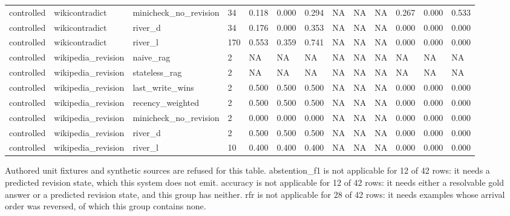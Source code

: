 \begin{table}
\begin{tabular}{lllllllllllll}
controlled & wikicontradict & minicheck\_no\_revision & 34 & 0.118 & 0.000 & 0.294 & NA & NA & NA & 0.267 & 0.000 & 0.533 \\
controlled & wikicontradict & river\_d & 34 & 0.176 & 0.000 & 0.353 & NA & NA & NA & 0.000 & 0.000 & 0.000 \\
controlled & wikicontradict & river\_l & 170 & 0.553 & 0.359 & 0.741 & NA & NA & NA & 0.000 & 0.000 & 0.000 \\
controlled & wikipedia\_revision & naive\_rag & 2 & NA & NA & NA & NA & NA & NA & NA & NA & NA \\
controlled & wikipedia\_revision & stateless\_rag & 2 & NA & NA & NA & NA & NA & NA & NA & NA & NA \\
controlled & wikipedia\_revision & last\_write\_wins & 2 & 0.500 & 0.500 & 0.500 & NA & NA & NA & 0.000 & 0.000 & 0.000 \\
controlled & wikipedia\_revision & recency\_weighted & 2 & 0.500 & 0.500 & 0.500 & NA & NA & NA & 0.000 & 0.000 & 0.000 \\
controlled & wikipedia\_revision & minicheck\_no\_revision & 2 & 0.000 & 0.000 & 0.000 & NA & NA & NA & 0.000 & 0.000 & 0.000 \\
controlled & wikipedia\_revision & river\_d & 2 & 0.500 & 0.500 & 0.500 & NA & NA & NA & 0.000 & 0.000 & 0.000 \\
controlled & wikipedia\_revision & river\_l & 10 & 0.400 & 0.400 & 0.400 & NA & NA & NA & 0.000 & 0.000 & 0.000 \\
\end{tabular}
\footnotesize{Authored unit fixtures and synthetic sources are refused for this table.}
\footnotesize{abstention\_f1 is not applicable for 12 of 42 rows: it needs a predicted revision state, which this system does not emit.}
\footnotesize{accuracy is not applicable for 12 of 42 rows: it needs either a resolvable gold answer or a predicted revision state, and this group has neither.}
\footnotesize{rfr is not applicable for 28 of 42 rows: it needs examples whose arrival order was reversed, of which this group contains none.}
\end{table}

